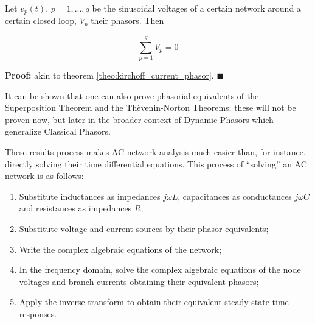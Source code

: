 \begin{theorem} \label{theo:kirchoff_voltage_phasor}
Let $v_p(t)$, $p = 1,...,q$ be the sinusoidal voltages of a certain network around a certain closed loop, $V_p$ their phasors. Then

\begin{equation} \sum\limits_{p=1}^q V_p = 0 \end{equation}

\end{theorem}
\noindent \textbf{Proof:} akin to theorem \ref{theo:kirchoff_current_phasor}. \hfill$\blacksquare$

	It can be shown  that one can also prove phasorial equivalents of the Superposition Theorem and the Thèvenin-Norton Theorems; these will not be proven now, but later in the broader context of Dynamic Phasors which generalize Classical Phasors.

	These results process makes AC network analysis much easier than, for instance, directly solving their time differential equations. This process of ``solving'' an AC network is as follows:

\begin{enumerate}
	\item Substitute inductances as impedances $j\omega L$, capacitances as conductances $j\omega C$ and resistances as impedances $R$;
	\item Substitute voltage and current sources by their phasor equivalents;
	\item Write the complex algebraic equations of the network;
	\item In the frequency domain, solve the complex algebraic equations of the node voltages and branch currents obtaining their equivalent phasors;
	\item Apply the inverse transform to obtain their equivalent steady-state time responses.
\end{enumerate}

